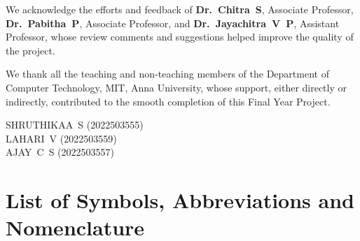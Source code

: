 \documentclass[12pt,a4paper,oneside]{report}
\begin{document}
We acknowledge the efforts and feedback of \textbf{Dr.~Chitra~S}, Associate Professor, \textbf{Dr.~Pabitha~P}, Associate Professor, and \textbf{Dr.~Jayachitra~V~P}, Assistant Professor, whose review comments and suggestions helped improve the quality of the project.

We thank all the teaching and non-teaching members of the Department of Computer Technology, MIT, Anna University, whose support, either directly or indirectly, contributed to the smooth completion of this Final Year Project.

\vspace{20pt}
\begin{flushright}
SHRUTHIKAA~S (2022503555) \\
LAHARI~V (2022503559) \\
AJAY~C~S (2022503557)
\end{flushright}

\tableofcontents
\listoftables
\listoffigures

\chapter*{List of Symbols, Abbreviations and Nomenclature}
\end{document}
